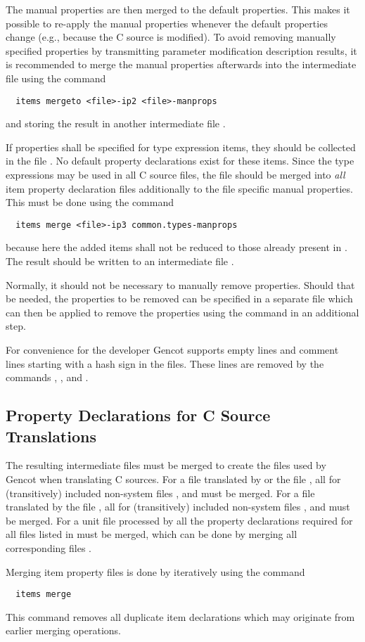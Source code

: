 The manual properties are then merged to the default properties. This makes it possible to re-apply the manual properties 
whenever the default properties change (e.g., because the C source is modified). To avoid removing manually specified 
properties by transmitting parameter modification description results, it is recommended to merge the manual properties 
afterwards into the intermediate file  using the command
\begin{verbatim}
  items mergeto <file>-ip2 <file>-manprops
\end{verbatim}
and storing the result in another intermediate file .

If properties shall be specified for type expression items, they should be collected in the file .
No default property declarations exist for these items. Since the type expressions may be used in all C source files, the 
file should be merged into \textit{all} item property declaration files additionally to the file specific manual properties.
This must be done using the command
\begin{verbatim}
  items merge <file>-ip3 common.types-manprops
\end{verbatim}
because here the added items shall not be reduced to those already present in . The result 
should be written to an intermediate file .

Normally, it should not be necessary to manually remove properties. Should that be needed, the properties to be removed can
be specified in a separate file which can then be applied to remove the properties using the command  in 
an additional step.

For convenience for the developer Gencot supports empty lines and comment lines starting with a hash sign \code{\#} in the 
 files. These lines are removed by the commands , , and .

\subsection{Property Declarations for C Source Translations}
\label{app-itemprops-unit}

The resulting intermediate files  must be merged to create the files  used 
by Gencot when translating C sources. For a file  translated by  or 
the file , all  for (transitively) included non-system files , and 
must be merged. For a file  translated by 
the file , all  for (transitively) included non-system files , and 
must be merged. For a unit file  processed by  all the property declarations required
for all files  listed in  must be merged, which can be done by merging all corresponding
files .

Merging item property files is done by iteratively using the command
\begin{verbatim}
  items merge
\end{verbatim}
This command removes all duplicate item declarations which may originate from earlier merging operations.

